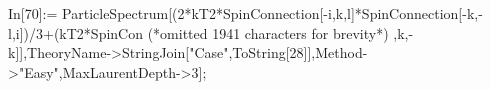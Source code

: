 In[70]:= ParticleSpectrum[(2*kT2*SpinConnection[-i,k,l]*SpinConnection[-k,-l,i])/3+(kT2*SpinCon (*omitted 1941 characters for brevity*) ,k,-k]],TheoryName->StringJoin["Case",ToString[28]],Method->"Easy",MaxLaurentDepth->3];